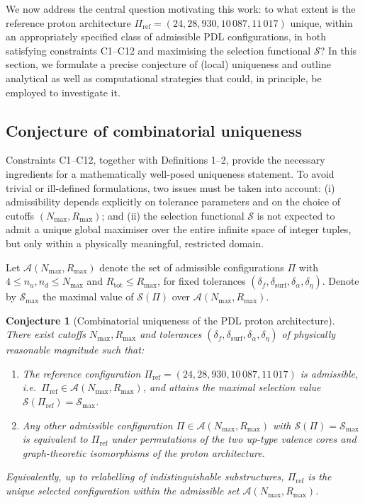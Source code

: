 \documentclass[11pt,a4paper]{article}
\newtheorem{conjecture}{Conjecture}
\begin{document}
We now address the central question motivating this work: to what extent is the reference proton architecture $\Pi_{\mathrm{ref}}=(24,28,930,10\,087,11\,017)$ unique, within an appropriately specified class of admissible PDL configurations, in both satisfying constraints C1–C12 and maximising the selection functional $\mathcal{S}$? In this section, we formulate a precise conjecture of (local) uniqueness and outline analytical as well as computational strategies that could, in principle, be employed to investigate it.

\subsection{Conjecture of combinatorial uniqueness}

Constraints C1–C12, together with Definitions 1–2, provide the necessary ingredients for a mathematically well-posed uniqueness statement. To avoid trivial or ill-defined formulations, two issues must be taken into account: (i) admissibility depends explicitly on tolerance parameters and on the choice of cutoffs $(N_{\max},R_{\max})$; and (ii) the selection functional $\mathcal{S}$ is not expected to admit a unique global maximiser over the entire infinite space of integer tuples, but only within a physically meaningful, restricted domain.

Let $\mathcal{A}(N_{\max},R_{\max})$ denote the set of admissible configurations $\Pi$ with $4\leq n_u,n_d\leq N_{\max}$ and $R_{\mathrm{tot}}\leq R_{\max}$, for fixed tolerances $(\delta_f,\delta_{\mathrm{surf}},\delta_{\alpha},\delta_{\eta})$. Denote by $\mathcal{S}_{\max}$ the maximal value of $\mathcal{S}(\Pi)$ over $\mathcal{A}(N_{\max},R_{\max})$.

\begin{conjecture}[Combinatorial uniqueness of the PDL proton architecture]
\label{conj:uniqueness}
There exist cutoffs $N_{\max},R_{\max}$ and tolerances $(\delta_f,\delta_{\mathrm{surf}},\delta_{\alpha},\delta_{\eta})$ of physically reasonable magnitude such that:
\begin{enumerate}[label=(U\arabic*)]
\item The reference configuration $\Pi_{\mathrm{ref}}=(24,28,930,10\,087,11\,017)$ is admissible, i.e.\ $\Pi_{\mathrm{ref}}\in\mathcal{A}(N_{\max},R_{\max})$, and attains the maximal selection value $\mathcal{S}(\Pi_{\mathrm{ref}})=\mathcal{S}_{\max}$.
\item Any other admissible configuration $\Pi\in\mathcal{A}(N_{\max},R_{\max})$ with $\mathcal{S}(\Pi)=\mathcal{S}_{\max}$ is equivalent to $\Pi_{\mathrm{ref}}$ under permutations of the two up-type valence cores and graph-theoretic isomorphisms of the proton architecture.
\end{enumerate}
Equivalently, up to relabelling of indistinguishable substructures, $\Pi_{\mathrm{ref}}$ is the unique selected configuration within the admissible set $\mathcal{A}(N_{\max},R_{\max})$.
\end{conjecture}
\end{document}
